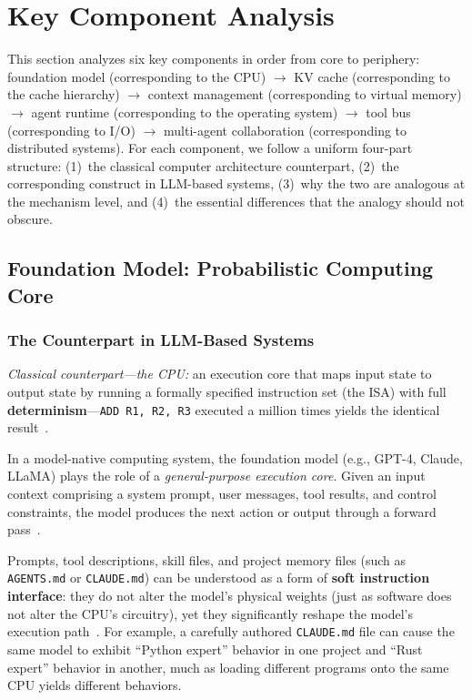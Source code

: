 \section{Key Component Analysis}
\label{sec:components}

This section analyzes six key components in order from core to periphery:
foundation model (corresponding to the CPU) $\to$ KV cache (corresponding to the cache hierarchy) $\to$ context management (corresponding to virtual memory) $\to$ agent runtime (corresponding to the operating system) $\to$ tool bus (corresponding to I/O) $\to$ multi-agent collaboration (corresponding to distributed systems).
For each component, we follow a uniform four-part structure: (1)~the classical computer architecture counterpart, (2)~the corresponding construct in LLM-based systems, (3)~why the two are analogous at the mechanism level, and (4)~the essential differences that the analogy should not obscure.

\subsection{Foundation Model: Probabilistic Computing Core}
\label{sec:model}

\subsubsection{The Counterpart in LLM-Based Systems}

\textit{Classical counterpart---the CPU:} an execution core that maps input state to output state by running a formally specified instruction set (the ISA) with full \textbf{determinism}---\texttt{ADD R1, R2, R3} executed a million times yields the identical result~\cite{riscv_spec_2026}.

In a model-native computing system, the foundation model (e.g., GPT-4, Claude, LLaMA) plays the role of a \textit{general-purpose execution core}.
Given an input context comprising a system prompt, user messages, tool results, and control constraints, the model produces the next action or output through a forward pass~\cite{vaswani2017attention,brown2020gpt3,llama2023}.

Prompts, tool descriptions, skill files, and project memory files (such as \texttt{AGENTS.md} or \texttt{CLAUDE.md}) can be understood as a form of \textbf{soft instruction interface}: they do not alter the model's physical weights (just as software does not alter the CPU's circuitry), yet they significantly reshape the model's execution path~\cite{openai_codex_agents_md_2026,openai_codex_skills_2026,anthropic_claudecode_memory_2026}.
For example, a carefully authored \texttt{CLAUDE.md} file can cause the same model to exhibit ``Python expert'' behavior in one project and ``Rust expert'' behavior in another, much as loading different programs onto the same CPU yields different behaviors.

